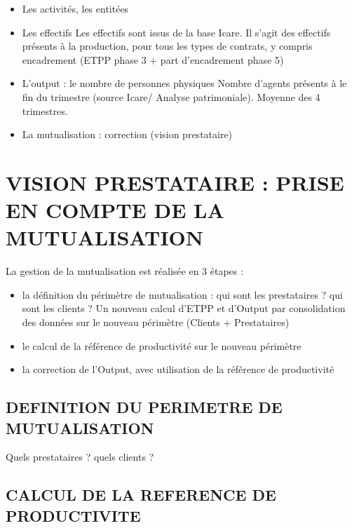 \documentclass[
]{book}
\begin{document}
\begin{itemize}
\item
  Les activités, les entitées
\item
  Les effectifs
  Les effectifs sont issus de la base Icare.
  Il s'agit des effectifs présents à la production, pour tous les types de contrats, y compris encadrement (ETPP phase 3 + part d'encadrement phase 5)
\item
  L'output : le nombre de personnes physiques
  Nombre d'agents présents à le fin du trimestre (source Icare/ Analyse patrimoniale). Moyenne des 4 trimestres.
\item
  La mutualisation : correction (vision prestataire)
\end{itemize}

\hypertarget{vision-prestataire-prise-en-compte-de-la-mutualisation-4}{%
\section{VISION PRESTATAIRE : PRISE EN COMPTE DE LA MUTUALISATION}\label{vision-prestataire-prise-en-compte-de-la-mutualisation-4}}

La gestion de la mutualisation est réalisée en 3 étapes :

\begin{itemize}
\item
  la définition du périmètre de mutualisation : qui sont les prestataires ? qui sont les clients ? Un nouveau calcul d'ETPP et d'Output par consolidation des données sur le nouveau périmètre (Clients + Prestataires)
\item
  le calcul de la référence de productivité sur le nouveau périmètre
\item
  la correction de l'Output, avec utilisation de la référence de productivité
\end{itemize}

\hypertarget{definition-du-perimetre-de-mutualisation-4}{%
\subsection{DEFINITION DU PERIMETRE DE MUTUALISATION}\label{definition-du-perimetre-de-mutualisation-4}}

Quels prestataires ? quels clients ?

\hypertarget{calcul-de-la-reference-de-productivite-4}{%
\subsection{CALCUL DE LA REFERENCE DE PRODUCTIVITE}\label{calcul-de-la-reference-de-productivite-4}}
\end{document}
